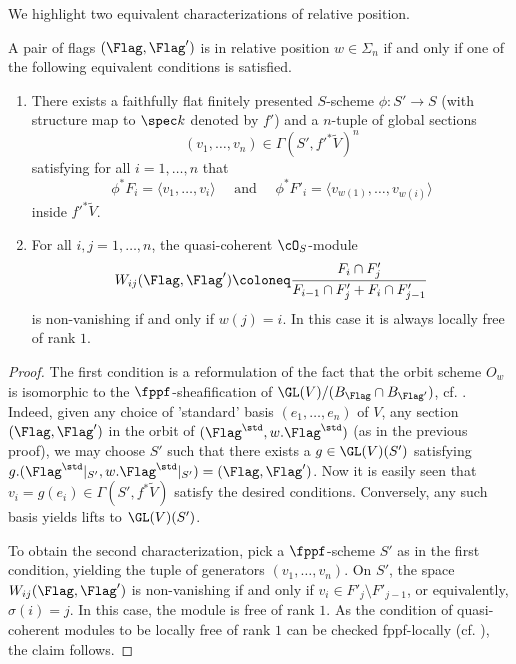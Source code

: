 We highlight two equivalent
characterizations of relative position. 

\begin{prop}\label{prop:RelativePosition2}
  A pair of flags $(\Flag, \Flag')$ is in relative position $w \in \Sigma_n$ 
  if and only if one of the following equivalent conditions is satisfied.
  \begin{enumerate}
    \item There exists a faithfully flat finitely presented $S$-scheme 
      $\phi: S' \to S$ (with structure map to $\spec k$ denoted by $f'$) and a
      $n$-tuple of global sections 
      $$(v_1, \dots, v_n) \in \Gamma(S', f'^* \tilde V)^n$$ satisfying for all $i =
      1, \dots, n$ that 
      \begin{equation*}
        \phi^* F_i  = \langle v_1, \dots, v_i \rangle
        \quad \text{ and } \quad 
        \phi^* F'_i  = \langle v_{w(1)}, \dots, v_{w(i)} \rangle
      \end{equation*}
      inside $f'^* \tilde V$. 
    \item For all $i,j = 1, \dots, n$, the quasi-coherent $\cO_S$-module 
      \begin{equation}\label{eq:RelPosCond}
        W_{ij}(\Flag, \Flag') \coloneq \frac{F_i \cap F'_{j}}{F_{i-1} \cap F'_{j} +
        F_i \cap F'_{j-1}}
      \end{equation}
      is non-vanishing if and only if $w(j) = i$. In this case it is always
      locally free of rank $1$.
  \end{enumerate}
  \begin{proof}
    The first condition is a reformulation of the fact that the orbit scheme
    $O_w$ is isomorphic to the $\fppf$-sheafification of 
    $\GL(V)/(B_{\Flag} \cap B_{\Flag'})$, cf. \cite[Definition 5.20 and
    Corollary 7.13]{milne2017algebraic}. Indeed, given any choice 
    of 'standard' basis $(e_1, \dots, e_n)$ of $V$, any section $(\Flag, \Flag')$
    in the orbit of $(\Flag^\std, w.\Flag^\std)$ (as in the previous proof), we
    may choose $S'$ such that there exists a $g \in \GL(V)(S')$ 
    satisfying $g.(\Flag^\std|_{S'}, w.\Flag^{\std}|_{S'}) = (\Flag, \Flag')$.
    Now it is easily seen that $v_i = g(e_i) \in \Gamma(S', f^*\tilde V)$
    satisfy the desired conditions. Conversely, any such basis yields lifts
    to $\GL(V)(S')$.

    To obtain the second characterization, pick a $\fppf$-scheme $S'$ as in the
    first condition, yielding the tuple of generators $(v_1, \dots, v_n)$. On
    $S'$, the space $W_{ij}(\Flag, \Flag')$ is non-vanishing if and only if
    $v_{i} \in F'_j \setminus F'_{j-1}$, or equivalently, $\sigma(i) = j$. In
    this case, the module is free of rank $1$. As the condition
    of quasi-coherent modules to be locally free of rank $1$ can be checked 
    fppf-locally (cf. \cite[Proposition 14.48]{gortz2020algebraic}), the claim 
    follows.
  \end{proof}
\end{prop}


